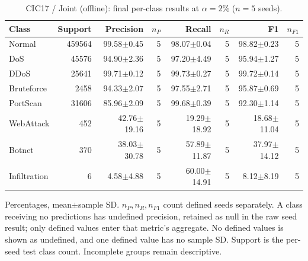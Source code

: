 \begin{table}[t]
\centering\scriptsize
\setlength{\tabcolsep}{3.3pt}
\caption{CIC17 / Joint (offline): final per-class results at $\alpha=2\%$ ($n=5$ seeds).}\label{tab:forgetting-class-cic_ids_2017-joint}
\begin{tabular}{lrrrrrrr}
\toprule
Class & Support & Precision & $n_P$ & Recall & $n_R$ & F1 & $n_{F1}$ \\
\midrule
Normal & 459564 & 99.58$\pm$0.45 & 5 & 98.07$\pm$0.04 & 5 & 98.82$\pm$0.23 & 5 \\
DoS & 45576 & 94.90$\pm$2.36 & 5 & 97.20$\pm$4.49 & 5 & 95.94$\pm$1.27 & 5 \\
DDoS & 25641 & 99.71$\pm$0.12 & 5 & 99.73$\pm$0.27 & 5 & 99.72$\pm$0.14 & 5 \\
Bruteforce & 2458 & 94.33$\pm$2.07 & 5 & 97.55$\pm$2.71 & 5 & 95.87$\pm$0.69 & 5 \\
PortScan & 31606 & 85.96$\pm$2.09 & 5 & 99.68$\pm$0.39 & 5 & 92.30$\pm$1.14 & 5 \\
WebAttack & 452 & 42.76$\pm$19.16 & 5 & 19.29$\pm$18.92 & 5 & 18.68$\pm$11.04 & 5 \\
Botnet & 370 & 38.03$\pm$30.78 & 5 & 57.89$\pm$11.87 & 5 & 37.97$\pm$14.12 & 5 \\
Infiltration & 6 & 4.58$\pm$4.88 & 5 & 60.00$\pm$14.91 & 5 & 8.12$\pm$8.19 & 5 \\
\bottomrule
\end{tabular}
\par\smallskip\begin{minipage}{0.98\textwidth}\scriptsize Percentages, mean$\pm$sample SD. $n_P,n_R,n_{F1}$ count defined seeds separately. A class receiving no predictions has undefined precision, retained as null in the raw seed result; only defined values enter that metric's aggregate. No defined values is shown as undefined, and one defined value has no sample SD. Support is the per-seed test class count. Incomplete groups remain descriptive.\end{minipage}
\end{table}
